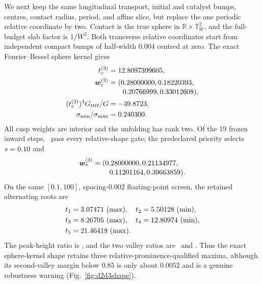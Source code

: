 \documentclass[aps,physrev,reprint,amsmath,amssymb,longbibliography,floatfix]{revtex4-2}
\begin{document}
We next keep the same longitudinal transport, initial and catalyst bumps,
centres, contact radius, period, and affine slice, but replace the one
periodic relative coordinate by two.  Contact is the true sphere in
$\mathbb R\times\mathbb T_W^2$, and the full-budget slab factor is $1/W^2$.
Both transverse relative coordinates start from independent compact bumps of
half-width $0.004$ centred at zero.  The exact Fourier--Bessel sphere kernel
gives
\begin{align}
 t_c^{(3)}&=12.8097399605,\nonumber\\
 \bm w_c^{(3)}&=(0.28000000,0.18220393,\nonumber\\[-2pt]
 &\qquad 0.20766999,0.33012608),\nonumber\\
 (t_c^{(3)})^4G_{tttt}/G&=-39.8723,\nonumber\\
 \sigma_{\min}/\sigma_{\max}&=0.240300.
\label{eq:dthreecusp}
\end{align}
All cusp weights are interior and the unfolding has rank two.  Of the 19
frozen inward steps, \DThreeEligibleCount\ pass every relative-shape gate;
the predeclared priority selects $s=0.10$ and
\begin{equation}
 \begin{split}
 \bm w_*^{(3)}={}&(0.28000000,0.21134977,\\[-2pt]
 &\quad 0.11201164,0.39663859).
 \end{split}
\label{eq:dthreeselected}
\end{equation}
On the same $[0.1,100]$, spacing-$0.002$ floating-point screen, the retained
alternating roots are
\begin{equation}
 \begin{split}
 &t_1=3.07471\ ({\rm max}),\quad
 t_2=5.50128\ ({\rm min}),\\
 &t_3=8.26705\ ({\rm max}),\quad
 t_4=12.80974\ ({\rm min}),\\
 &t_5=21.46418\ ({\rm max}).
 \end{split}
\label{eq:dthreeroots}
\end{equation}
The peak-height ratio is \DThreePeakRatio, and the two valley ratios are
\DThreeValleyOne\ and \DThreeValleyTwo.  Thus the exact sphere-kernel shape
retains three relative-prominence-qualified maxima, although its second-valley
margin below $0.85$ is only about $0.0052$ and is a genuine robustness warning
(Fig.~\ref{fig:d2d3shape}).
\end{document}
